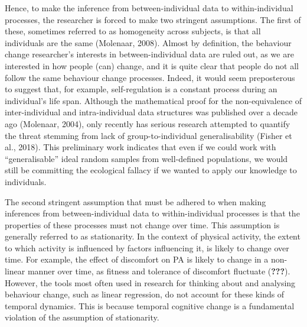 \documentclass[
  british,
  man,floatsintext]{apa6}
\begin{document}
Hence, to make the inference from between-individual data to within-individual processes, the researcher is forced to make two stringent assumptions. The first of these, sometimes referred to as homogeneity across subjects, is that all individuals are the same (Molenaar, 2008). Almost by definition, the behaviour change researcher's interests in between-individual data are ruled out, as we are interested in how people (can) change, and it is quite clear that people do not all follow the same behaviour change processes. Indeed, it would seem preposterous to suggest that, for example, self-regulation is a constant process during an individual's life span. Although the mathematical proof for the non-equivalence of inter-individual and intra-individual data structures was published over a decade ago (Molenaar, 2004), only recently has serious research attempted to quantify the threat stemming from lack of group-to-individual generalisability (Fisher et al., 2018). This preliminary work indicates that even if we could work with \enquote{generalisable} ideal random samples from well-defined populations, we would still be committing the ecological fallacy if we wanted to apply our knowledge to individuals.

The second stringent assumption that must be adhered to when making inferences from between-individual data to within-individual processes is that the properties of these processes must not change over time. This assumption is generally referred to as stationarity. In the context of physical activity, the extent to which activity is influenced by factors influencing it, is likely to change over time. For example, the effect of discomfort on PA is likely to change in a non-linear manner over time, as fitness and tolerance of discomfort fluctuate ({\textbf{???}}). However, the tools most often used in research for thinking about and analysing behaviour change, such as linear regression, do not account for these kinds of temporal dynamics. This is because temporal cognitive change is a fundamental violation of the assumption of stationarity.
\end{document}
